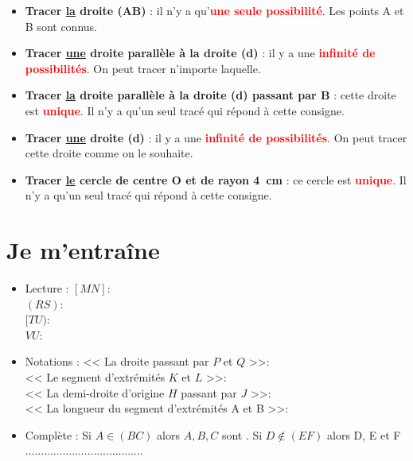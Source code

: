 \begin{itemize}
	\item \textbf{Tracer \underline{la} droite (AB)} : il n'y a qu'\textbf{\textcolor{red}{une seule possibilité}}. Les points A et B sont connus.
	
	\item \textbf{Tracer \underline{une} droite parallèle à la droite (d)} : il y a une \textbf{\textcolor{red}{infinité de possibilités}}. On peut tracer n'importe laquelle.
	
	\item \textbf{Tracer \underline{la} droite parallèle à la droite (d) passant par B} : cette droite est \textbf{\textcolor{red}{unique}}. Il n'y a qu'un seul tracé qui répond à cette consigne.
	
	\item \textbf{Tracer \underline{une} droite (d)} : il y a une \textbf{\textcolor{red}{infinité de possibilités}}. On peut tracer cette droite comme on le souhaite.
	
	\item \textbf{Tracer \underline{le} cercle de centre O et de rayon 4~cm} : ce cercle est \textbf{\textcolor{red}{unique}}. Il n'y a qu'un seul tracé qui répond à cette consigne.
\end{itemize}

\section{ Je m'entraîne}
\begin{itemize}
	\item Lecture : $[MN]$: \trous{12cm}\\
	 $(RS)$: \trous{12cm}\\
	 $[TU)$: \trous{12cm}\\
	 $VU$: \trous{12cm}
	\item Notations : << La droite passant par $P$ et $Q$ >>: \trous{12cm}\\
	 << Le segment d'extrémités $K$ et $L$ >>: \trous{12cm} \\
	 << La demi-droite d'origine $H$ passant par $J$ >>: \trous{12cm} \\
	 << La longueur du segment d'extrémités A et B >>: \trous{12cm}
	\item Complète : Si $A \in (BC)$ alors $A,B,C$ sont \trou{3cm}. Si $D \notin (EF)$ alors D, E et F ......................................
\end{itemize}
